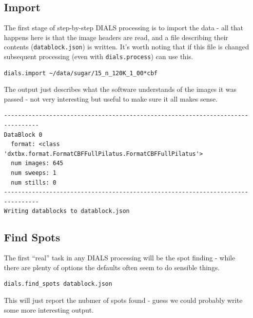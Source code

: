 \documentclass[a4paper, 11pt]{article}
\begin{document}
\subsection{Import}

The first stage of step-by-step DIALS processing is to import the data
- all that happens here is that the image headers are read, and a file
describing their contents (\verb|datablock.json|) is written. It's
worth noting that if this file is changed subsequent processing (even
with \verb|dials.process|) can use this.

{\small
\begin{verbatim}
dials.import ~/data/sugar/15_n_120K_1_00*cbf 
\end{verbatim}
}

\noindent 
The output just describes what the software understands of the images
it was passed - not very interesting but useful to make sure it all
makes sense.

{\small
\begin{verbatim}
--------------------------------------------------------------------------------
DataBlock 0
  format: <class 'dxtbx.format.FormatCBFFullPilatus.FormatCBFFullPilatus'>
  num images: 645
  num sweeps: 1
  num stills: 0
--------------------------------------------------------------------------------
Writing datablocks to datablock.json
\end{verbatim}
}

\subsection{Find Spots}

The first ``real'' task in any DIALS processing will be the spot
finding - while there are plenty of options the defaults often seem to
do sensible things.

{\small
\begin{verbatim}
dials.find_spots datablock.json 
\end{verbatim}
}

\noindent
This will just report the nubmer of spots found - guess we could
probably write some more interesting output.
\end{document}
